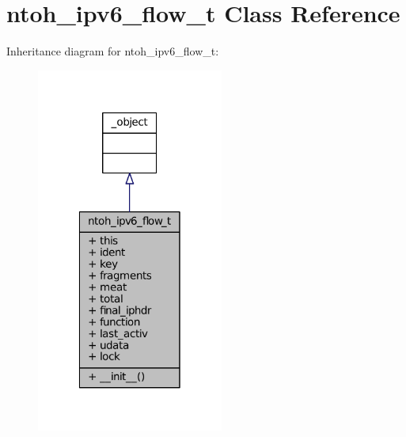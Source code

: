 \hypertarget{classlibntoh_1_1ntoh__ipv6__flow__t}{\section{ntoh\-\_\-ipv6\-\_\-flow\-\_\-t Class Reference}
\label{classlibntoh_1_1ntoh__ipv6__flow__t}
}


Inheritance diagram for ntoh\-\_\-ipv6\-\_\-flow\-\_\-t\-:
\nopagebreak
\begin{figure}[H]
\begin{center}
\leavevmode
\includegraphics[width=174pt]{classlibntoh_1_1ntoh__ipv6__flow__t__inherit__graph}
\end{center}
\end{figure}


